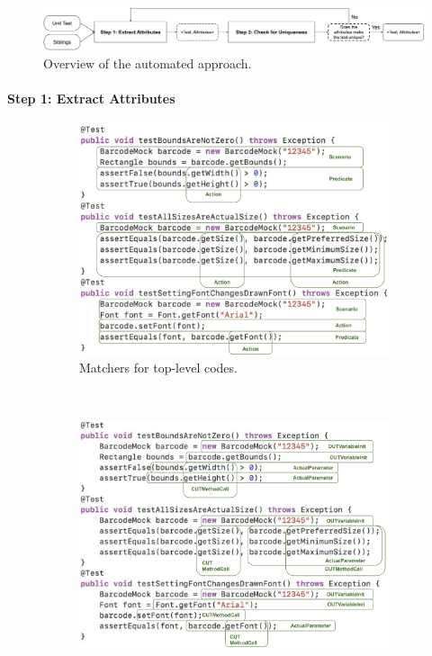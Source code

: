 \begin{figure}[t]
\centering
\includegraphics[width=\textwidth]{figures/ApproachOverview}
\caption{Overview of the automated approach.}
\label{fig:overview}
\end{figure}

\paragraph{Step 1: Extract Attributes}

\begin{figure}[t]
\centering
\begin{subfigure}[b]{0.5\textwidth}
\centering
\includegraphics[scale=0.26]{figures/step1-1.png}
\caption{Matchers for top-level codes.}
\label{fig:matcher1}
\end{subfigure}\\
\vspace{0.2cm}
\begin{subfigure}[b]{0.5\textwidth}
\centering
\includegraphics[scale=0.26]{figures/step1-2.png}

\end{subfigure}
\end{figure}
